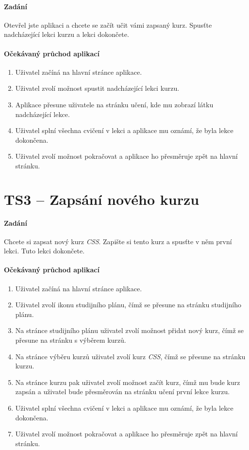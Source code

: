 \paragraph{Zadání} Otevřel jste aplikaci a chcete se začít učit vámi zapsaný kurz. Spusťte nadcházející lekci kurzu a lekci dokončete.

\paragraph{Očekávaný průchod aplikací}

\begin{enumerate}
    \item Uživatel začíná na hlavní stránce aplikace.
    \item Uživatel zvolí možnost spustit nadcházející lekci kurzu.
    \item Aplikace přesune uživatele na stránku učení, kde mu zobrazí látku nadcházející lekce.
    \item Uživatel splní všechna cvičení v lekci a aplikace mu oznámí, že byla lekce dokončena.
    \item Uživatel zvolí možnost pokračovat a aplikace ho přesměruje zpět na hlavní stránku.
\end{enumerate}

\section{TS3 -- Zapsání nového kurzu}

\paragraph{Zadání} Chcete si zapsat nový kurz \textit{CSS}. Zapište si tento kurz a spusťte v něm první lekci. Tuto lekci dokončete.

\paragraph{Očekávaný průchod aplikací}

\begin{enumerate}
    \item Uživatel začíná na hlavní stránce aplikace.
    \item Uživatel zvolí ikonu studijního plánu, čímž se přesune na stránku studijního plánu.
    \item Na stránce studijního plánu uživatel zvolí možnost přidat nový kurz, čímž se přesune na stránku s výběrem kurzů.
    \item Na stránce výběru kurzů uživatel zvolí kurz \textit{CSS}, čímž se přesune na stránku kurzu.
    \item Na stránce kurzu pak uživatel zvolí možnost začít kurz, čímž mu bude kurz zapsán a uživatel bude přesměrován na stránku učení první lekce kurzu.
    \item Uživatel splní všechna cvičení v lekci a aplikace mu oznámí, že byla lekce dokončena.
    \item Uživatel zvolí možnost pokračovat a aplikace ho přesměruje zpět na hlavní stránku.
\end{enumerate}

